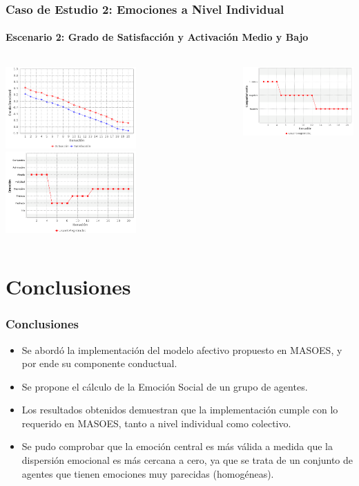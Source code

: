 \documentclass{beamer}
\begin{document}
\begin{frame}
\frametitle{Caso de Estudio 2: Emociones a Nivel Individual}
\framesubtitle{Escenario 2: Grado de Satisfacción y Activación Medio y Bajo}
\begin{columns}
\tiny
\centering
\includegraphics[width=5cm]{ilustraciones/caso2escenerio2-estado-emocional-colaborador1}
\tiny
\centering
\includegraphics[width=5cm]{ilustraciones/caso2escenerio2-modificacion-de-emociones}

\includegraphics[width=5cm]{ilustraciones/caso2escenerio2-modificacion-de-comportamiento}
\end{columns}
\end{frame}


\section{Conclusiones}
\begin{frame}
\frametitle{Conclusiones}
\begin{itemize}
  \item Se abordó la implementación del modelo afectivo
  propuesto en MASOES, y por ende su componente conductual.
	\item Se propone el cálculo de
  la Emoción Social de un grupo de agentes.
  \item Los resultados obtenidos demuestran que la implementación cumple
  con lo requerido en MASOES, tanto a nivel individual como colectivo.
  \item Se pudo comprobar que la emoción central es más válida a medida que la dispersión
  emocional es más cercana a cero, ya que se trata de un conjunto de agentes que tienen emociones muy parecidas (homogéneas).
\end{itemize}
\end{frame}
\end{document}
